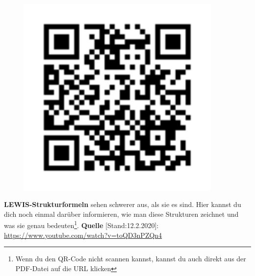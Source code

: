 \documentclass{scrartcl}  %
\begin{document}
		\begin{tcolorbox}[enhanced,
			colback=white,
			colframe=black,
			fonttitle=\sffamily\bfseries\large, 
			title=LEWIS-Strukturformeln,  %
			attach boxed title to top left={xshift=3.2mm,yshift=-0.50mm},
			boxed title style={skin=enhancedfirst jigsaw,size=small,arc=1mm,bottom=-1mm,colframe=black,height=0.75cm},
			colbacktitle=black,
			drop lifted shadow]
			\begin{figure}  
				\centering
				\vspace{-14pt}  %
				\includegraphics[width=0.9\textwidth]{img/musstewissen_lewis}
			\end{figure}
			
			\textbf{LEWIS-Strukturformeln} sehen schwerer aus, als sie es sind. Hier kannst du dich noch einmal darüber informieren, wie man diese Strukturen zeichnet und was sie genau bedeuten\footnote{Wenn du den QR-Code nicht scannen kannst, kannst du auch direkt aus der PDF-Datei auf die URL klicken}. \newline
			\textbf{Quelle} [Stand:12.2.2020]: \newline 
			\url{https://www.youtube.com/watch?v=toQD3nPZQn4}
			\vspace{0.5cm}  %
		\end{tcolorbox}	

	
\end{document}
